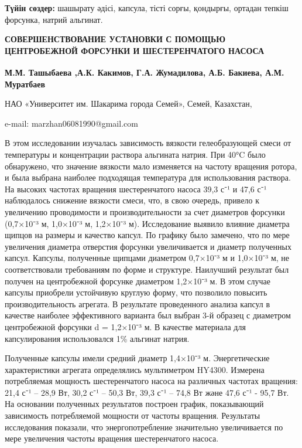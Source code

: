 {\bfseries Түйін сөздер:} шашырату әдісі, капсула, тісті сорғы, қондырғы,
ортадан тепкіш форсунка, натрий альгинат.

\begin{articleheader}
{\bfseries СОВЕРШЕНСТВОВАНИЕ УСТАНОВКИ С ПОМОЩЬЮ ЦЕНТРОБЕЖНОЙ ФОРСУНКИ И
ШЕСТЕРЕНЧАТОГО НАСОСА}

{\bfseries
М.М. Ташыбаева\textsuperscript{\envelope }
,А.К. Какимов,
Г.А. Жумадилова,
А.Б. Бакиева,
А.М. Муратбаев
}
\end{articleheader}

\begin{affiliation}
НАО «Университет им. Шакарима города Семей», Семей, Казахстан,

e-mail: marzhan06081990@gmail.com
\end{affiliation}

В этом исследовании изучалась зависимость вязкости гелеобразующей смеси
от температуры и концентрации раствора альгината натрия. При 40°C было
обнаружено, что значение вязкости мало изменяется на частоту вращения
ротора, и была выбрана наиболее подходящая температура для использования
раствора. На высоких частотах вращения шестеренчатого насоса 39,3 с⁻¹ и
47,6 с⁻¹ наблюдалось снижение вязкости смеси, что, в свою очередь,
привело к увеличению проводимости и производительности за счет диаметров
форсунки (0,7×10⁻³ м, 1,0×10⁻³ м, 1,2×10⁻³ м). Исследование выявило
влияние диаметра щипцов на размеры и качество капсул. По графику было
замечено, что по мере увеличения диаметра отверстия форсунки
увеличивается и диаметр полученных капсул. Капсулы, полученные щипцами
диаметром 0,7×10⁻³ м и 1,0×10⁻³ м, не соответствовали требованиям по
форме и структуре. Наилучший результат был получен на центробежной
форсунке диаметром 1,2×10⁻³ м. В этом случае капсулы приобрели
устойчивую круглую форму, что позволило повысить производительность
агрегата. В результате проведенного анализа капсул в качестве наиболее
эффективного варианта был выбран 3-й образец с диаметром центробежной
форсунки d = 1,2×10⁻³ м. В качестве материала для капсулирования
использовался 1\% альгинат натрия.

Полученные капсулы имели средний диаметр 1,4×10⁻³ м. Энергетические
характеристики агрегата определялись мультиметром HY4300. Измерена
потребляемая мощность шестеренчатого насоса на различных частотах
вращения: 21,4 с⁻¹ -- 28,9 Вт, 30,2 с⁻¹ -- 50,3 Вт, 39,3 с⁻¹ -- 74,8 Вт
және 47,6 с⁻¹ - 95,7 Вт. На основании полученных результатов построен
график, показывающий зависимость потребляемой мощности от частоты
вращения. Результаты исследования показали, что энергопотребление
значительно увеличивается по мере увеличения частоты вращения
шестеренчатого насоса.

